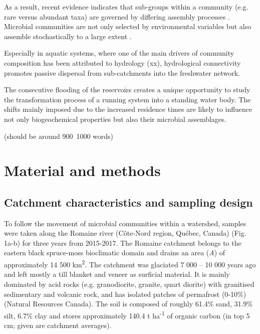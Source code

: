 \documentclass[12pt,a4paper]{article} %
\begin{document}
As a result, recent evidence indicates that sub-groups within a community (e.g. rare versus abundant taxa) are governed by differing assembly processes \citep{Bell2000, Magurran2003}. Microbial communities are not only selected by environmental variables but also assemble stochastically to a large extent \citep{Zhou2017, Jia2018}. 




Especially in aquatic systems, where one of the main drivers of community composition has been attributed to hydrology (xx), hydrological connectivity promotes passive dispersal from sub-catchments into the freshwater network. 

The consecutive flooding of the reservoirs creates a unique opportunity to study the transformation process of a running system into a standing water body. The shifts mainly imposed due to the increased residence times are likely to influence not only biogeochemical properties but also their microbial assemblages.

(should be around 900~1000 words)

\section*{Material and methods}
\subsection*{Catchment characteristics and sampling design}
To follow the movement of microbial communities within a watershed, samples were taken along the Romaine river (C\^{o}te-Nord region, Qu\'{e}bec, Canada) (Fig. 1a-b) for three years from 2015-2017. The Romaine catchment belongs to the eastern black spruce-moss bioclimatic domain and drains an area (\textit{A}) of approximately 14 500 km\textsuperscript{2}. The catchment was glaciated 7 000 – 10 000 years ago and left mostly a till blanket and veneer as surficial material. It is mainly dominated by acid rocks (e.g. granodiorite, granite, quart diorite) with granitised sedimentary and volcanic rock, and has isolated patches of permafrost (0-10\%)(Natural Resources Canada). The soil is composed of roughly 61.4\% sand, 31.9\% silt, 6.7\% clay and stores approximately 140.4 t ha\textsuperscript{-1} of organic carbon (in top 5 cm; given are catchment averages)\citep{Lehner2013, Hengl2014}.
\end{document}
